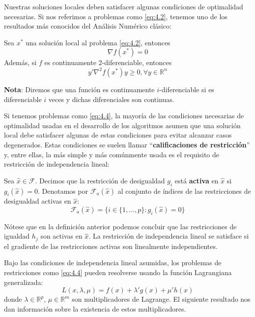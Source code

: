 Nuestras soluciones locales deben satisfacer algunas condiciones de optimalidad necesarias. 
Si nos referimos a problemas como \ref{eq:4.2}, tenemos uno de los resultados más conocidos del Análisis Numérico clásico:

\begin{proposicion}
Sea $x^*$ una solución local al problema \ref{eq:4.2}, entonces
\begin{equation}
\nabla f(x^*) = 0
\label{eq:4.5}
\end{equation}
Además, si $f$ es continuamente 2-diferenciable, entonces
\begin{equation}
y'\nabla^2f(x^*)y \geq 0, \forall y \in \mathbb{R}^n
\label{eq:4.6}
\end{equation}
\end{proposicion}

\textbf{Nota}: Diremos que una función es continuamente $i$-diferenciable si es diferenciable $i$ veces y dichas diferenciales son continuas.

Si tenemos problemas como \ref{eq:4.4}, la mayoría de las condiciones necesarias de optimalidad usadas en el desarrollo de los algoritmos asumen que una solución local debe satisfacer algunas de estas condiciones para evitar alcanzar casos degenerados. 
Estas condiciones se suelen llamar ``\textbf{calificaciones de restricción}'' y, entre ellas, la más simple y más comúnmente usada es el requisito de restricción de independencia lineal:

\begin{definicion}
Sea $\hat{x} \in\mathcal{F}$. 
Decimos que la restricción de desigualdad $g_i$ está \textbf{activa} en $\hat{x}$ si $g_i(\hat{x}) = 0$. 
Denotamos por $\mathcal{F}_a(\hat{x})$ al conjunto de índices de las restricciones de desigualdad activas en $\hat{x}$:
\begin{equation}
\mathcal{F}_a(\hat{x}) = \{i \in\{1,...,p\} : g_i(\hat{x})=0\}
\label{eq:4.7}
\end{equation}
\end{definicion}

Nótese que en la definición anterior podemos concluir que las restricciones de igualdad $h_j$ son activas en $\hat{x}$. 
La restricción de independencia lineal se satisface si el gradiente de las restricciones activas son linealmente independientes.

Bajo las condiciones de independencia lineal asumidas, los problemas de restricciones como \ref{eq:4.4} pueden resolverse usando la función Lagrangiana generalizada:
\begin{equation}
L(x,\lambda,\mu) = f(x) +\lambda'g(x) + \mu'h(x)
\label{eq:4.8}
\end{equation}
donde $\lambda\in\mathbb{R}^p$, $\mu\in\mathbb{R}^m$ son multiplicadores de Lagrange. 
El siguiente resultado nos dan información sobre la existencia de estos multiplicadores. 


